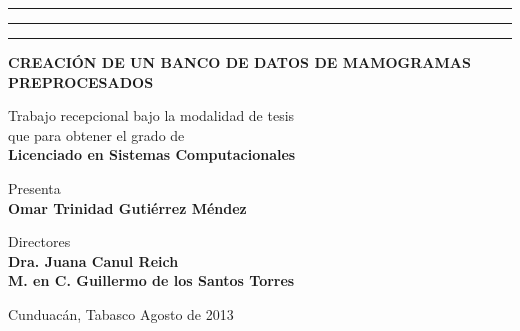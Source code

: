 {{    %
    \begin{minipage}[ht]{0.10\textwidth}
        \flushleft
        \rule{3pt}{16cm} 
        \rule{4pt}{16cm} 
        \rule{3pt}{16cm} 
    \end{minipage}
    \begin{minipage}[th]{0.89\textwidth}
    \centering
    {\bfseries{\Large CREACIÓN DE UN BANCO DE DATOS DE MAMOGRAMAS
    PREPROCESADOS}}
    \vspace*{2\baselineskip} \vfill

    Trabajo recepcional bajo la modalidad de tesis \\
    que para obtener el grado de\\[\baselineskip] 
    
    {\bfseries{\Large Licenciado en Sistemas Computacionales}}\\
    \vspace*{2\baselineskip} \vfill

    Presenta\\[\baselineskip]
    
    {\bfseries{\Large Omar Trinidad Gutiérrez Méndez}}\\
    \vspace*{2\baselineskip} \vfill
    
    Directores\\[\baselineskip]
    
    {\bfseries{\Large Dra. Juana Canul Reich}}\\
    {\bfseries{\Large M. en C. Guillermo de los Santos Torres}}\\
    \vspace*{2\baselineskip} \vfill

    Cunduacán, Tabasco \hfill Agosto de 2013
    \end{minipage}

} %

\newpage 
\thispagestyle{empty}
\mbox{}

{\selectfont

    \newpage
    \thispagestyle{empty}

    \setcounter{page}{3}

}}

